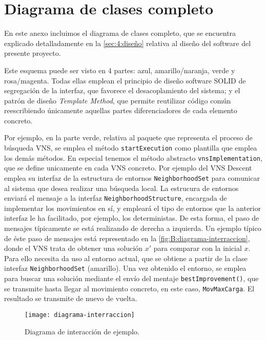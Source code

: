 \graphicspath{{anexos/AnexoB-Diagrama-Clases-Completo/recursos/}}

\section{Diagrama de clases completo} \label{Anexo:diagrama-clases}

En este anexo incluimos el diagrama de clases completo, que se encuentra explicado detalladamente en la \autoref{sec:4:diseño} relativa al diseño del software del presente proyecto.

Este esquema puede ser visto en 4 partes: azul, amarillo/naranja, verde y rosa/magenta. Todas ellas emplean el principio de diseño software SOLID de segregación de la interfaz, que favorece el desacoplamiento del sistema; y el patrón de diseño \textit{Template Method}, que permite reutilizar código común reescribiendo únicamente aquellas partes diferenciadores de cada elemento concreto.

Por ejemplo, en la parte verde, relativa al paquete que representa el proceso de búsqueda VNS, se emplea el método \texttt{startExecution} como plantilla que emplea los demás métodos. En especial tenemos el método abstracto \texttt{vnsImplementation}, que se define unicamente en cada VNS concreto. Por ejemplo del VNS Descent emplea su interfaz de la estructura de entornos \texttt{NeighborhoodSet} para comunicar al sistema que desea realizar una búsqueda local. La estrucura de entornos enviará el mensaje a la interfaz \texttt{NeighborhoodStructure}, encargada de implementar los movimientos en sí, y empleará el tipo de entornos que la anterior interfaz le ha facilitado, por ejemplo, los deterministas. De esta forma, el paso de mensajes típicamente se está realizando de derecha a izquierda. Un ejemplo típico de éste paso de mensajes está representado en la \autoref{fig:B:diagrama-interraccion}, donde el VNS trata de obtener una solución $x'$ para comparar con la inicial $x$. Para ello necesita da uso al entorno actual, que se obtiene a partir de la clase interfaz \texttt{NeighborhoodSet} (amarillo). Una vez obtenido el entorno, se emplea para buscar una solución mediante el envío del mentaje \texttt{bestImprovement()}, que se transmite hasta llegar al movimiento concreto, en este caso, \texttt{MovMaxCarga}. El resultado se transmite de nuevo de vuelta.

\begin{figure}[h]
	\centering
	\texttt{[image: diagrama-interraccion]}
	\caption{Diagrama de interacción de ejemplo.}
	\label{fig:B:diagrama-interraccion}
\end{figure}


\begin{landscape}

\end{landscape}